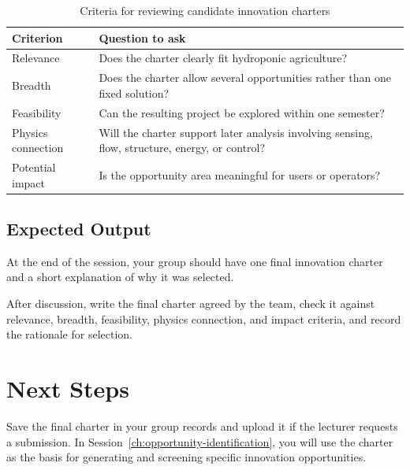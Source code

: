\begin{table}[htbp]
\centering
\caption{Criteria for reviewing candidate innovation charters}
\label{tab:session3-charter-criteria}
\renewcommand{\arraystretch}{1.2}
\begin{tabularx}{\textwidth}{|>{\raggedright\arraybackslash}p{}|X|}
\hline
\textbf{Criterion} & \textbf{Question to ask} \\
\hline
Relevance & Does the charter clearly fit hydroponic agriculture? \\
\hline
Breadth & Does the charter allow several opportunities rather than one fixed solution? \\
\hline
Feasibility & Can the resulting project be explored within one semester? \\
\hline
Physics connection & Will the charter support later analysis involving sensing, flow, structure, energy, or control? \\
\hline
Potential impact & Is the opportunity area meaningful for users or operators? \\
\hline
\end{tabularx}
\end{table}

\subsection{Expected Output}

At the end of the session, your group should have one final innovation charter and a short explanation of why it was selected.

\begin{tcolorbox}[title=Checkpoint]
After discussion, write the final charter agreed by the team, check it against relevance, breadth, feasibility, physics connection, and impact criteria, and record the rationale for selection.
\end{tcolorbox}

\section{Next Steps}

Save the final charter in your group records and upload it if the lecturer requests a submission. In Session~\ref{ch:opportunity-identification}, you will use the charter as the basis for generating and screening specific innovation opportunities.
